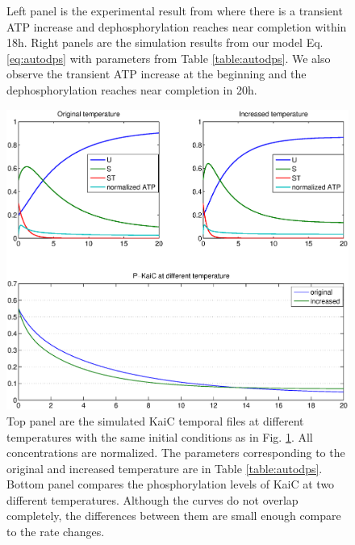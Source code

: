 \documentclass[a4paper,10pt]{article}
\numberwithin{equation}{section}
\begin{document}
\begin{figure}
\begin{subfigure}{0.45\textwidth }
\end{subfigure}
\caption{\selectfont Left panel is the experimental result from \citet{kondo2012} where there is a transient ATP increase and dephosphorylation reaches near completion within 18h. Right panels are the simulation results from our model Eq.\ref{eq:autodps} with parameters from Table \ref{table:autodps}. We also observe the transient ATP increase at the beginning and the dephosphorylation reaches near completion in 20h. }\label{fig:autodpsoriginal}
\end{figure}

\begin{figure}
\centering
\includegraphics[scale=0.6]{autodps5tempcompfig9.eps}
\caption{\selectfont Top panel are the simulated KaiC temporal files at different temperatures with the same initial conditions as in Fig. \ref{fig:autodpsoriginal}. All concentrations are normalized. The parameters corresponding to the original and increased temperature are in Table \ref{table:autodps}. Bottom panel compares the phosphorylation levels of KaiC at two different temperatures. Although the curves do not overlap completely, the differences between them are small enough compare to the rate changes. }\label{fig:autodpstempcomp}
\end{figure}
\end{document}
